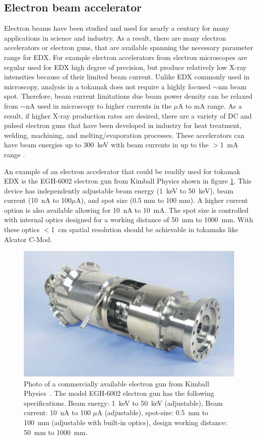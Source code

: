 \documentclass[12pt,letterpaper,final]{article}
\begin{document}
\subsection{Electron beam accelerator}
\label{sec:ElectronGun}
Electron beams have been studied and used for nearly a century for many applications in science and industry. As a result, there are many electron accelerators or electron guns, that are available spanning the necessary parameter range for EDX. For example electron accelerators from electron microscopes are regular used for EDX high degree of precision, but produce relatively low X-ray intensities because of their limited beam current. Unlike EDX commonly used in microscopy, analysis in a tokamak does not require a highly focused $\sim$nm beam spot. Therefore, beam current limitations due beam power density can be relaxed from $\sim$nA used in microscopy to higher currents in the $\mu$A to mA range. As a result, if higher X-ray production rates are desired, there are a variety of DC and pulsed electron guns that have been developed in industry for heat treatment, welding, machining, and melting/evaporation processes. These accelerators can have beam energies up to 300~keV with beam currents in up to the $>$1~mA range \cite{HammHamm}.

An example of an electron accelerator that could be readily used for tokamak EDX is the EGH-6002 electron gun from Kimball Physics \cite{KimballPhysics} shown in figure \ref{fig:ElectronGun}. This device has independently adjustable beam energy (1~keV to 50~keV), beam current (10~nA to 100$\mu$A), and spot size (0.5 mm to 100 mm). A higher current option is also available allowing for 10~nA to 10~mA. The spot size is controlled with internal optics designed for a working distance of 50~mm to 1000~mm. With these optics $<$1~cm spatial resolution should be achievable in tokamaks like Alcator C-Mod.

\begin{figure}[!h]
 \centering
  \includegraphics[width=\columnwidth]{figures/ElectronGunEGH6002.png}
 \caption{Photo of a commercially available electron gun from Kimball Physics~\cite{KimballPhysics}. The model EGH-6002 electron gun has the following specifications. Beam energy: 1~keV to 50~keV (adjustable), Beam current: 10~nA to 100 $\mu$A (adjustable), spot-size: 0.5~mm to 100~mm (adjustable with built-in optics), design working distance: 50~mm to 1000~mm.}
 \label{fig:ElectronGun}
\end{figure}
\end{document}
